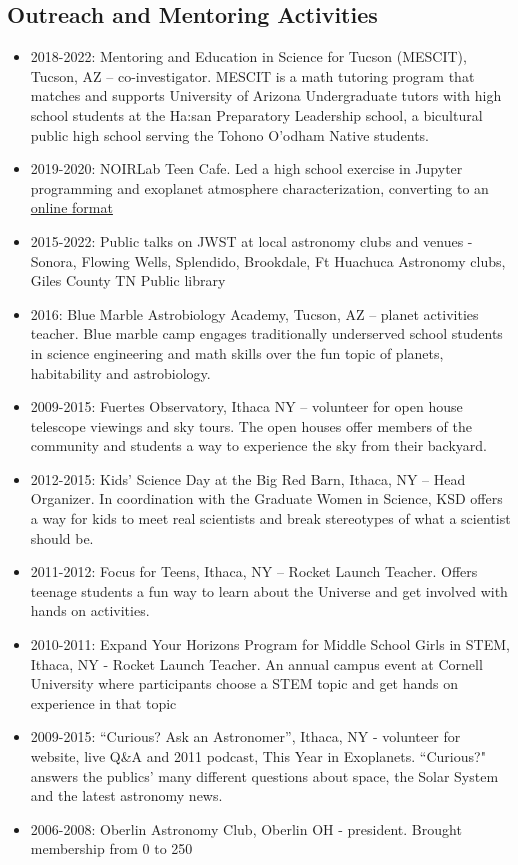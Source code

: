 \documentclass[11pt, oneside]{article}   	%
\begin{document}
\subsection*{Outreach and Mentoring Activities}
\begin{itemize}[noitemsep]
    \item 2018-2022: Mentoring and Education in Science for Tucson (MESCIT), Tucson, AZ -- co-investigator. MESCIT is a math tutoring program that matches and supports University of Arizona Undergraduate tutors with high school students at the Ha:san Preparatory Leadership school, a bicultural public high school serving the Tohono O'odham Native students.
    \item 2019-2020: NOIRLab Teen Cafe. Led a high school exercise in Jupyter programming and exoplanet atmosphere characterization, converting to an \href{https://eas342.github.io/interactive_lc/exoplanet_spectra_cafe.html}{online format}
    \item 2015-2022: Public talks on JWST at local astronomy clubs and venues - Sonora, Flowing Wells, Splendido, Brookdale, Ft Huachuca Astronomy clubs, Giles County TN Public library
    \item 2016: Blue Marble Astrobiology Academy, Tucson, AZ -- planet activities teacher. Blue marble camp engages traditionally underserved school students in science engineering and math skills over the fun topic of planets, habitability and astrobiology.
    \item 2009-2015: Fuertes Observatory, Ithaca NY -- volunteer for open house telescope viewings and sky tours. The open houses offer members of the community and students a way to experience the sky from their backyard.
    \item 2012-2015: Kids' Science Day at the Big Red Barn, Ithaca, NY -- Head Organizer. In coordination with the Graduate Women in Science, KSD offers a way for kids to meet real scientists and break stereotypes of what a scientist should be.
    \item 2011-2012: Focus for Teens, Ithaca, NY -- Rocket Launch Teacher. Offers teenage students a fun way to learn about the Universe and get involved with hands on activities.
    \item 2010-2011: Expand Your Horizons Program for Middle School Girls in STEM, Ithaca, NY - Rocket Launch Teacher. An annual campus event at Cornell University where participants choose a STEM topic and get hands on experience in that topic
    \item 2009-2015: ``Curious? Ask an Astronomer'', Ithaca, NY - volunteer for website, live Q\&A and 2011 podcast, This Year in Exoplanets. ``Curious?" answers the publics' many different questions about space, the Solar System and the latest astronomy news.
    \item 2006-2008: Oberlin Astronomy Club, Oberlin OH - president. Brought membership from 0 to 250
 \end{itemize}
\end{document}
